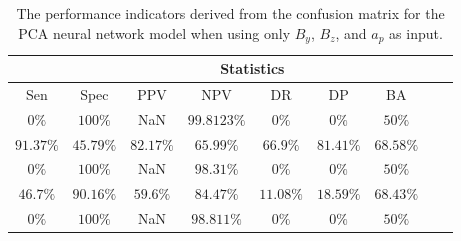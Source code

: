 \begin{table}[!ht]
	\centering
	\begin{tabular}{|c|c|c|c|c|c|c|c|c|}
		\hline
		 & \multicolumn{7}{c|}{Statistics} \\ \hline
		Sen & Spec & PPV & NPV & DR & DP & BA \\ \hline
		$0\%$ & $100\%$ & NaN & $99.8123\%$ & $0\%$ & $0\%$ & $50\%$ \\ \hline
		$91.37\%$ & $45.79\%$ & $82.17\%$ & $65.99\%$ & $66.9\%$ & $81.41\%$ & $68.58\%$ \\ \hline
		$0\%$ & $100\%$ & NaN & $98.31\%$ & $0\%$ & $0\%$ & $50\%$ \\ \hline
		$46.7\%$ & $90.16\%$ & $59.6\%$ & $84.47\%$ & $11.08\%$ & $18.59\%$ & $68.43\%$ \\ \hline
		$0\%$ & $100\%$ & NaN & $98.811\%$ & $0\%$ & $0\%$ & $50\%$ \\ \hline
	\end{tabular}
	\caption{The performance indicators derived from the confusion matrix for the PCA neural network model when using only $B_{y}$, $B_{z}$, and $a_{p}$ as input.}
	\label{tab:cs:yzap:pcaNNet}
\end{table}
